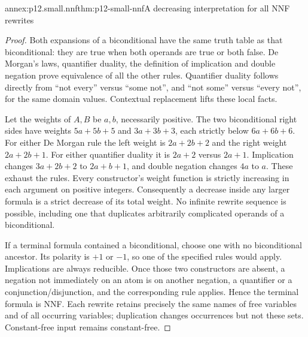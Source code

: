 \begin{annexitem}{annex:p12.small.nnf}{thm:p12-small-nnf}{A decreasing interpretation for all NNF rewrites}
\begin{proof}
Both expansions of a biconditional have the same truth table as
that biconditional: they are true when both operands are true or
both false. De Morgan's laws, quantifier duality, the definition
of implication and double negation prove equivalence of all the
other rules. Quantifier duality follows directly from ``not every''
versus ``some not'', and ``not some'' versus ``every not'', for the
same domain values. Contextual replacement lifts these local facts.

Let the weights of \(A,B\) be \(a,b\), necessarily positive.
The two biconditional right sides have weights
\(5a+5b+5\) and \(3a+3b+3\), each strictly below
\(6a+6b+6\). For either De Morgan rule the left weight is
\(2a+2b+2\) and the right weight \(2a+2b+1\).
For either quantifier duality it is \(2a+2\) versus \(2a+1\).
Implication changes \(3a+2b+2\) to \(2a+b+1\), and double
negation changes \(4a\) to \(a\). These exhaust the rules.
Every constructor's weight function is strictly increasing in
each argument on positive integers. Consequently a decrease inside
any larger formula is a strict decrease of its total weight.
No infinite rewrite sequence is possible, including one that
duplicates arbitrarily complicated operands of a biconditional.

If a terminal formula contained a biconditional, choose one with
no biconditional ancestor. Its polarity is \(+1\) or \(-1\),
so one of the specified rules would apply. Implications are always
reducible. Once those two constructors are absent, a negation not
immediately on an atom is on another negation, a quantifier or a
conjunction/disjunction, and the corresponding rule applies.
Hence the terminal formula is NNF. Each rewrite retains precisely
the same names of free variables and of all occurring variables;
duplication changes occurrences but not these sets. Constant-free
input remains constant-free.


\end{proof}
\end{annexitem}
